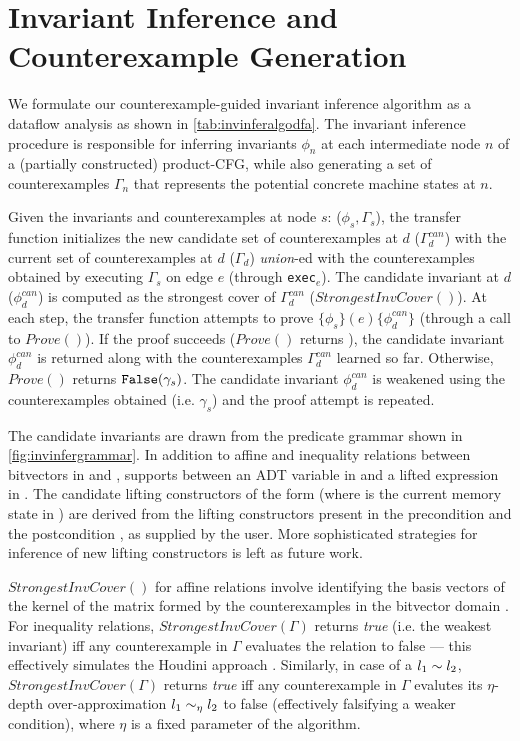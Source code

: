 


\section{Invariant Inference and Counterexample Generation}
\label{sec:invinferalgo}
We formulate our counterexample-guided invariant inference algorithm as a dataflow analysis
as shown in \cref{tab:invinferalgodfa}.
The invariant inference procedure is responsible for inferring invariants $\phi_n$ at each intermediate
node $n$ of a (partially constructed) product-CFG, while also generating a set of counterexamples
$\Gamma_n$ that represents the potential concrete machine states at $n$.

Given the invariants and counterexamples at node $s$: ($\phi_s,\Gamma_s$),
the transfer function initializes the new candidate set of counterexamples at $d$ ($\Gamma^{can}_{d}$)
with the current set of counterexamples at $d$ ($\Gamma_{d}$) {\em union}-ed with
the counterexamples obtained by executing $\Gamma_s$ on edge $e$ (through {\tt exec}$_e$).
The candidate invariant at $d$ ($\phi^{can}_d$) is computed as the strongest cover
of $\Gamma^{can}_{d}$ ($StrongestInvCover()$).
At each step, the transfer function attempts to prove $\{\phi_s\} (e) \{\phi^{can}_d\}$
(through a call to $Prove()$).
If the proof succeeds ($Prove()$ returns ), the candidate invariant $\phi^{can}_d$ is returned along with
the counterexamples $\Gamma^{can}_d$ learned so far.
Otherwise, $Prove()$ returns ${\tt False}(\gamma_s)$.
The candidate invariant $\phi^{can}_d$ is weakened using the counterexamples obtained
(i.e. $\gamma_s$) and the proof attempt is repeated.

The candidate invariants are drawn from the predicate grammar \invgrammar{} shown in \cref{fig:invinfergrammar}.
In addition to affine and inequality relations between bitvectors in \sprog{} and \cprog{},
\invgrammar{} supports \recursiveRelations{} between an ADT variable in \sprog{} and a lifted expression in \cprog{}.
The candidate lifting constructors of the form  (where \mem{} is the current
memory state in \cprog{}) are derived from the lifting constructors
present in the precondition \pre{} and the postcondition \post{}, as supplied by the user.
More sophisticated strategies for inference of new lifting constructors is left as future work.

$StrongestInvCover()$ for affine relations involve
identifying the basis vectors of the kernel of the
matrix formed by the counterexamples in the bitvector
domain \cite{esop05,semalign}.
For inequality relations, $StrongestInvCover(\Gamma)$
returns {\em true} (i.e. the weakest invariant) iff any counterexample in $\Gamma$ evaluates the
relation to false --- this effectively simulates the Houdini approach \cite{houdini}.
Similarly, in case of a \recursiveRelation{} $l_1 \sim{} l_2$, $StrongestInvCover(\Gamma)$
returns {\em true} iff any counterexample in $\Gamma$ evalutes its $\eta$-depth over-approximation
$l_1 \sim_{\eta} l_2$ to false (effectively falsifying a weaker condition), where $\eta$ is a fixed parameter of the algorithm.

